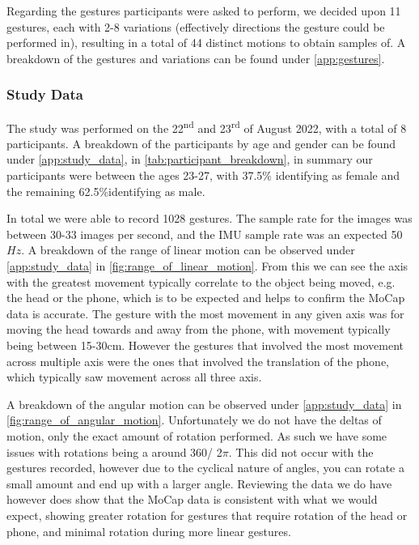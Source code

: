 Regarding the gestures participants were asked to perform, we decided upon 11 gestures, each with 2-8 variations (effectively directions the gesture could be performed in), resulting in a total of 44 distinct motions to obtain samples of. A breakdown of the gestures and variations can be found under \autoref{app:gestures}.

\subsubsection{Study Data}\nl
The study was performed on the 22\textsuperscript{nd} and 23\textsuperscript{rd} of August 2022, with a total of 8 participants.
A breakdown of the participants by age and gender can be found under \autoref{app:study_data}, in \autoref{tab:participant_breakdown}, in summary our participants were between the ages 23-27, with 37.5\% identifying as female and the remaining 62.5\%identifying as male.

In total we were able to record 1028 gestures. The sample rate for the images was between 30-33 images per second, and the IMU sample rate was an expected 50$Hz$.
A breakdown of the range of linear motion can be observed under \autoref{app:study_data} in \autoref{fig:range_of_linear_motion}.
From this we can see the axis with the greatest movement typically correlate to the object being moved, e.g. the head or the phone, which is to be expected and helps to confirm the MoCap data is accurate.
The gesture with the most movement in any given axis was for moving the head towards and away from the phone, with movement typically being between 15-30cm. However the gestures that involved the most movement across multiple axis were the ones that involved the translation of the phone, which typically saw movement across all three axis.

A breakdown of the angular motion can be observed under \autoref{app:study_data} in \autoref{fig:range_of_angular_motion}.
Unfortunately we do not have the deltas of motion, only the exact amount of rotation performed. As such we have some issues with rotations being a around 360\textdegree / 2$\pi$. This did not occur with the gestures recorded, however due to the cyclical nature of angles, you can rotate a small amount and end up with a larger angle. 
Reviewing the data we do have however does show that the MoCap data is consistent with what we would expect, showing greater rotation for gestures that require rotation of the head or phone, and minimal rotation during more linear gestures.

